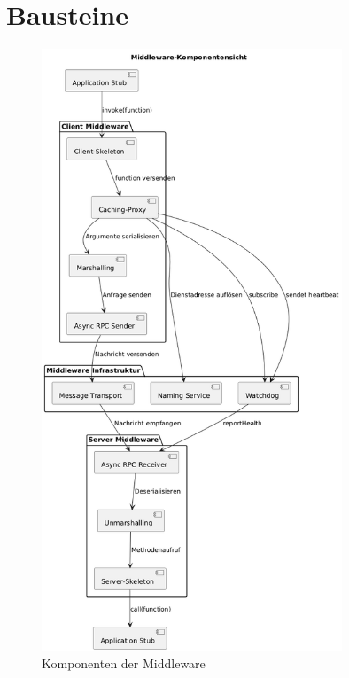 \newcommand{\comment}[1]{}

\comment{
	@startuml
	title Middleware-Komponenten – Asynchrones RPC (ohne Anwendung)
	
	package "Client-Middleware" {
		[Client-Proxy]
		[Marshalling]
		[Async RPC Sender]
		
		
	}
	
	package "Middleware Infrastruktur" {
		[Naming Service]
		[Message Transport]
	}
	
	[Client-Proxy] --> [Naming Service] : Dienstadresse auflösen
	[Client-Proxy] --> [Marshalling] : Argumente serialisieren
	[Marshalling] --> [Async RPC Sender] : Anfrage senden
	package "Server-Middleware" {
		[Async RPC Receiver]
		[Unmarshalling]
		[Server-Skeleton]
		
		[Async RPC Receiver] --> [Unmarshalling] : Deserialisieren
		[Unmarshalling] --> [Server-Skeleton] : Methodenaufruf
	}
	
	
	[Async RPC Sender] --> [Message Transport]
	[Message Transport] --> [Async RPC Receiver]
	@enduml
}




\section*{Bausteine}

\begin{figure}[htbp!]
	\centering
	\includegraphics[width=0.8\textwidth]{diagrams/Baustein_Midd.png}
	\caption{Komponenten der Middleware}
	\label{fig:meine-abbildung}
\end{figure}